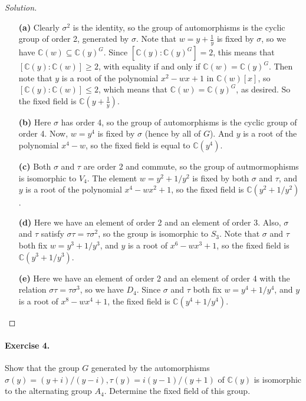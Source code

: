 \documentclass{article}
\newcommand{\C}{\mathbb C}
\begin{document}
\begin{proof}[Solution]\hfill

\begin{itemize}
\item[{\bf(a)}] Clearly $\sigma^2$ is the identity, so the group of
  automorphisms is the cyclic group of order 2, generated by $\sigma$.  
Note that $w=y+\frac1y$ is fixed by $\sigma$, so we have
$\C(w)\subseteq \C(y)^G$. Since $[\C(y):\C(y)^G]=2$, this means that
$[\C(y):\C(w)]\geq 2$, with equality if and only if $\C(w)=\C(y)^G$. 
Then note that $y$ is a root of the polynomial $x^2-wx+1$ in $\C(w)[x]$, so
$[\C(y):\C(w)]\leq 2$, which means that $\C(w)=\C(y)^G$, as desired.
So the fixed field is $\C(y+\frac1y)$.

\item[{\bf(b)}] Here $\sigma$ has order 4, so the group of
  automorphisms is the cyclic group of order 4. Now, $w=y^4$ is fixed
  by $\sigma$ (hence by all of $G$). And $y$ is a root of the
  polynomial $x^4-w$, so the fixed field is equal to $\C(y^4)$. 


\item[{\bf(c)}] Both $\sigma$ and $\tau$ are order 2 and commute, so
  the group of autmormophisms is isomorphic to $V_4$. The element
  $w=y^2+1/y^2$ is fixed by both $\sigma$ and $\tau$, and $y$ is a
  root of 
  the polynomial $x^4-wx^2+1$, so the fixed field is $\C(y^2+1/y^2)$.


\item[{\bf(d)}] Here we have an element of order 2 and an element of
  order 3. Also, $\sigma$ and $\tau$ satisfy $\sigma \tau = \tau
  \sigma^2$, so the group is isomorphic to
  $S_3$. Note that $\sigma$ and $\tau$ both fix $w=y^3+1/y^3$, and $y$
  is a root of $x^6-wx^3+1$, so the fixed field is $\C(y^3+1/y^3)$. 


\item[{\bf(e)}] Here we have an element of order 2 and an element of
  order 4 with the relation $\sigma\tau=\tau\sigma^3$, so we have
  $D_4$. Since $\sigma$ and $\tau$ both fix $w=y^4+1/y^4$, and $y$ is
  a  root of $x^8-wx^4+1$, the fixed field is $\C(y^4+1/y^4)$.

\end{itemize}
\end{proof}



\paragraph{Exercise 4.} Show that the group $G$ generated by the automorphisms
$\sigma(y)=(y+i)/(y-i), \tau(y)=i(y-1)/(y+1)$ of $\mathbb C(y)$
is isomorphic to the alternating group $A_4$. Determine
the fixed field of this group.  
\end{document}
